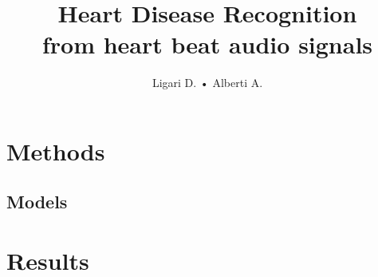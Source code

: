 \documentclass[twocolumn]{class}
\title{Heart Disease Recognition \\ from heart beat audio signals}
\author{Ligari D. • Alberti A.}
\begin{document}
\maketitle
\pagestyle{FirstPage}

\tableofcontents




\pagestyle{OtherPage}

\section{Methods}




\subsection{Models} %







\section{Results}







\clearpage


\clearpage
\printbibliography
\end{document}
